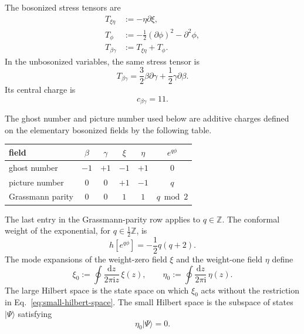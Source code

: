 \documentclass[12pt]{article}
\numberwithin{equation}{section}
\renewcommand{\i}{\mathrm{i}}
\renewcommand{\d}{\mathrm{d}}
\begin{document}
The bosonized stress tensors are
\begin{align}
T_{\xi\eta}
&:=-\eta\partial\xi,
\label{eq:T-xi-eta}
\\
T_\phi
&:=-\frac12(\partial\phi)^2-\partial^2\phi,
\label{eq:T-phi}
\\
T_{\beta\gamma}
&:=T_{\xi\eta}+T_\phi.
\label{eq:T-beta-gamma}
\end{align}
In the unbosonized variables, the same stress tensor is
\begin{equation}
T_{\beta\gamma}
=\frac32\beta\partial\gamma
+\frac12\gamma\partial\beta.
\label{eq:T-beta-gamma-unbosonized}
\end{equation}
Its central charge is
\begin{equation}
c_{\beta\gamma}=11.
\label{eq:c-beta-gamma}
\end{equation}

The ghost number and picture number used below are additive charges defined
on the elementary bosonized fields by the following table.
\begin{center}
\begin{tabular}{lccccc}
\toprule
field & $\beta$ & $\gamma$ & $\xi$ & $\eta$ & $e^{q\phi}$ \\
\midrule
ghost number & $-1$ & $+1$ & $-1$ & $+1$ & $0$ \\
picture number & $0$ & $0$ & $+1$ & $-1$ & $q$ \\
Grassmann parity & $0$ & $0$ & $1$ & $1$ & $q\bmod 2$ \\
\bottomrule
\end{tabular}
\end{center}
\medskip
The last entry in the Grassmann-parity row applies to $q\in\mathbb Z$.  The
conformal weight of the exponential, for $q\in\tfrac12\mathbb Z$, is
\begin{equation}
h\!\left[e^{q\phi}\right]
=-\frac12q(q+2).
\label{eq:phi-exponential-weight}
\end{equation}
The mode expansions of the weight-zero field $\xi$ and the weight-one field
$\eta$ define
\begin{equation}
\xi_0:=\oint\frac{\d z}{2\pi\i z}\,\xi(z),
\qquad
\eta_0:=\oint\frac{\d z}{2\pi\i}\,\eta(z).
\label{eq:xi-eta-zero-modes}
\end{equation}
The large Hilbert space is the state space on which $\xi_0$ acts without the
restriction in Eq.~\eqref{eq:small-hilbert-space}.  The small Hilbert space is
the subspace of states $|\Psi\rangle$ satisfying
\begin{equation}
\eta_0|\Psi\rangle=0.
\label{eq:small-hilbert-space}
\end{equation}
\end{document}
